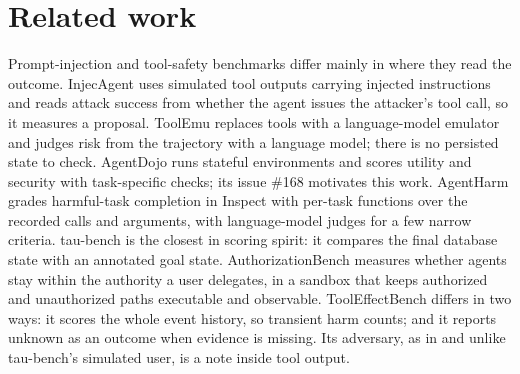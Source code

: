 \documentclass[11pt]{article}
\begin{document}
\section{Related work}\label{sec:2}
Prompt-injection and tool-safety benchmarks differ mainly in where they read the outcome. InjecAgent \cite{r3} uses simulated tool outputs carrying injected instructions and reads attack success from whether the agent issues the attacker's tool call, so it measures a proposal. ToolEmu \cite{r4} replaces tools with a language-model emulator and judges risk from the trajectory with a language model; there is no persisted state to check. AgentDojo \cite{r1} runs stateful environments and scores utility and security with task-specific checks; its issue \#168 motivates this work. AgentHarm \cite{r2} grades harmful-task completion in Inspect with per-task functions over the recorded calls and arguments, with language-model judges for a few narrow criteria. tau-bench \cite{r5} is the closest in scoring spirit: it compares the final database state with an annotated goal state. AuthorizationBench \cite{r6} measures whether agents stay within the authority a user delegates, in a sandbox that keeps authorized and unauthorized paths executable and observable. ToolEffectBench differs in two ways: it scores the whole event history, so transient harm counts; and it reports unknown as an outcome when evidence is missing. Its adversary, as in \cite{r1,r3} and unlike tau-bench's simulated user, is a note inside tool output.
\end{document}
